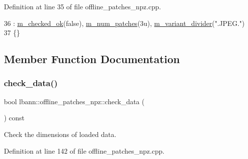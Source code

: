 Definition at line 35 of file offline\+\_\+patches\+\_\+npz.\+cpp.


\begin{DoxyCode}
36   : \hyperlink{classlbann_1_1offline__patches__npz_ab434320c2084790a2c99257d6c39fc85}{m\_checked\_ok}(\textcolor{keyword}{false}), \hyperlink{classlbann_1_1offline__patches__npz_a5c13583d344641295301f82a32ebee41}{m\_num\_patches}(3u), 
      \hyperlink{classlbann_1_1offline__patches__npz_aaab0b9040ce248875b6cdb430e054b3a}{m\_variant\_divider}(\textcolor{stringliteral}{".JPEG."})
37 \{\}
\end{DoxyCode}


\subsection{Member Function Documentation}
\mbox{\label{classlbann_1_1offline__patches__npz_a44d8cad35ff9ad245856c5408965e53b}} 
\subsubsection{\texorpdfstring{check\+\_\+data()}{check\_data()}}
{\footnotesize\ttfamily bool lbann\+::offline\+\_\+patches\+\_\+npz\+::check\+\_\+data (\begin{DoxyParamCaption}{ }\end{DoxyParamCaption}) const\hspace{0.3cm}{\ttfamily [protected]}}



Check the dimensions of loaded data. 



Definition at line 142 of file offline\+\_\+patches\+\_\+npz.\+cpp.


